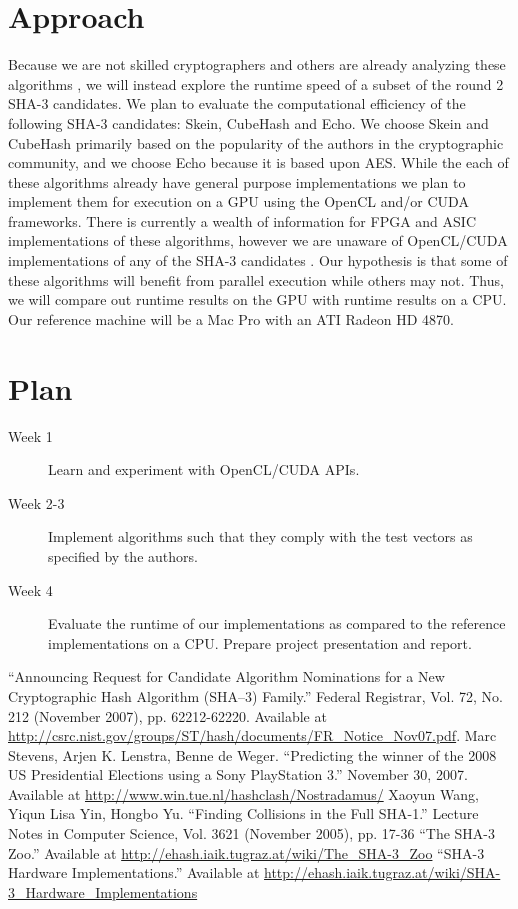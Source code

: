 \documentclass{article}
\begin{document}
\section*{Approach}
Because we are not skilled cryptographers and others are already analyzing these algorithms \cite{Sha3Zoo}, we will instead explore the runtime speed of a subset of the round 2 SHA-3 candidates.
We plan to evaluate the computational efficiency of the following SHA-3 candidates: Skein, CubeHash and Echo.
We choose Skein and CubeHash primarily based on the popularity of the authors in the cryptographic community, and we choose Echo because it is based upon AES.
While the each of these algorithms already have general purpose implementations we plan to implement them for execution on a GPU using the OpenCL and/or CUDA frameworks.
There is currently a wealth of information for FPGA and ASIC implementations of these algorithms, however we are unaware of OpenCL/CUDA implementations of any of the SHA-3 candidates \cite{Sha3Hardware}.
Our hypothesis is that some of these algorithms will benefit from parallel execution while others may not.
Thus, we will compare out runtime results on the GPU with runtime results on a CPU.
Our reference machine will be a Mac Pro with an ATI Radeon HD 4870.

\section*{Plan}
\begin{description}
  \item[Week 1] Learn and experiment with OpenCL/CUDA APIs.
  \item[Week 2-3] Implement algorithms such that they comply with the test vectors as specified by the authors.
  \item[Week 4] Evaluate the runtime of our implementations as compared to the reference implementations on a CPU. Prepare project presentation and report.
\end{description}

\begin{thebibliography}{9}
   ``Announcing Request for Candidate Algorithm Nominations for a New Cryptographic Hash Algorithm (SHA–3) Family.'' Federal Registrar, Vol. 72, No. 212 (November 2007), pp. 62212-62220. Available at \url{http://csrc.nist.gov/groups/ST/hash/documents/FR_Notice_Nov07.pdf}.
   Marc Stevens, Arjen K. Lenstra, Benne de Weger. ``Predicting the winner of the 2008 US Presidential Elections using a Sony PlayStation 3.'' November 30, 2007. Available at \url{http://www.win.tue.nl/hashclash/Nostradamus/}
   Xaoyun Wang, Yiqun Lisa Yin, Hongbo Yu. ``Finding Collisions in the Full SHA-1.'' Lecture Notes in Computer Science, Vol. 3621 (November 2005), pp. 17-36
   ``The SHA-3 Zoo.'' Available at \url{http://ehash.iaik.tugraz.at/wiki/The_SHA-3_Zoo}
   ``SHA-3 Hardware Implementations.'' Available at \url{http://ehash.iaik.tugraz.at/wiki/SHA-3_Hardware_Implementations}
\end{thebibliography}
\end{document}
